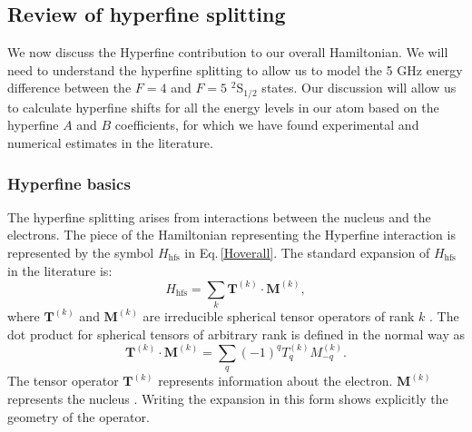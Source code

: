 \subsection{Review of hyperfine splitting}

We now discuss the Hyperfine contribution to our overall Hamiltonian. We will need to understand the hyperfine splitting to allow us to model the 5 GHz energy difference between the $F=4$ and $F=5$ $^2$S$_{1/2}$ states. Our discussion will allow us to calculate hyperfine shifts for all the energy levels in our atom based on the hyperfine $A$ and $B$ coefficients, for which we have found experimental and numerical estimates in the literature.

\subsubsection{Hyperfine basics}

The hyperfine splitting arises from interactions between the nucleus and the electrons. The piece of the Hamiltonian representing the Hyperfine interaction is represented by the symbol $H_{\mathrm{hfs}}$ in Eq.\,\eqref{Hoverall}.
The standard expansion of $H_{\mathrm{hfs}}$ in the literature is:  
\begin{equation}
H_{\mathrm{hfs}}=\sum_k \mathbf{T}^{(k)} \cdot \mathbf{M}^{(k)} \label{hfs_hamiltonian_eqn},
\end{equation}
where $\mathbf{T}^{(k)}$ and $\mathbf{M}^{(k)}$ are irreducible spherical tensor operators of rank $k$
\cite{schwartz_hyperfine_expansion}
\cite{experimental_hyperfine_alkali_arimondo}
\cite{chinesePhysics}.
The dot product for spherical tensors of arbitrary rank is defined in the normal way as
\begin{equation}\label{TkMk_hyperfine}
\mathbf{T}^{(k)}\cdot\mathbf{M}^{(k)}=\sum_q (-1)^qT_q^{(k)}M_{-q}^{(k)}.
\end{equation}
The tensor operator $\mathbf{T}^{(k)}$ represents information about the electron.
$\mathbf{M}^{(k)}$ represents the nucleus\cite{experimental_hyperfine_alkali_arimondo}\cite{schwartz_hyperfine_expansion}
\cite{sobelman_spectra}.
Writing the expansion in this form shows explicitly the geometry of the operator. 

